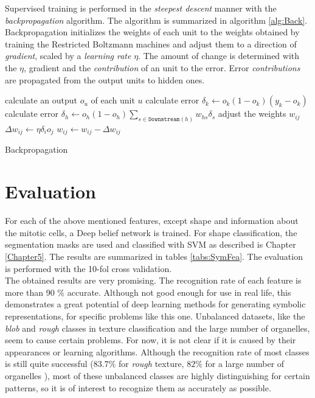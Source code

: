 Supervised training is performed in the \textit{steepest descent} manner with the \textit{backpropagation} algorithm. The algorithm is summarized in algorithm \ref{alg:Back}. Backpropagation initializes the weights of each unit to the weights obtained by training the Restricted Boltzmann machines and adjust them to a direction of \textit{gradient}, scaled by a \textit{learning rate} $\eta$. The amount of change is determined with the $\eta$, gradient and the \textit{contribution} of an unit to the error. Error \textit{contributions} are propagated from the output units to hidden ones. 

\begin{algorithm}
	\begin{algorithmic}[1]
					\State calculate an output  $o_u$ of each unit $u$
						\State calculate error $\delta_k \gets o_k(1-o_k)(y_k - o_k)$					
					\EndFor 
						\State calculate error $\delta_h \gets o_h(1-o_h)\sum_{s \in \mathtt{Downstream}(h)}w_{hs}\delta_s$ 					
					\EndFor
					\State adjust the weights $w_{ij}$
					\Statex \quad \quad $\Delta w_{ij} \gets \eta \delta_i o_j$ 
					\Statex \quad \quad $w_{ij} \gets w_{ij} - \Delta w_{ij}$
				\EndFor
			\EndWhile
		\EndFunction
	\end{algorithmic}
	\caption{Backpropagation}
	\label{alg:Back}
\end{algorithm} 




\section{Evaluation}

For each of the above mentioned features, except shape and information about the mitotic cells, a Deep belief network is trained. For shape classification, the segmentation masks are used and classified with SVM as described is Chapter \ref{Chapter5}. The results are summarized in tables \ref{tabs:SymFea}. The evaluation is performed with  the 10-fol cross validation. \\

The obtained results are very promising. The recognition rate of each feature is more than 90 \% accurate. Although not good enough for use in real life, this demonstrates a great potential of deep learning methods for generating symbolic representations, for specific problems like this one. Unbalanced datasets, like the \textit{blob} and \textit{rough} classes in texture classification and the large number of organelles, seem to cause certain problems. For now, it is not clear if it is caused by their appearances or learning algorithms. Although the recognition rate of most classes is still quite successful ($ 83.7 \%$ for \textit{rough} texture, $82 \%$ for a large number of organelles ),  most of these unbalanced classes are highly distinguishing for certain patterns, so it is of interest to recognize them as accurately as possible. \\

